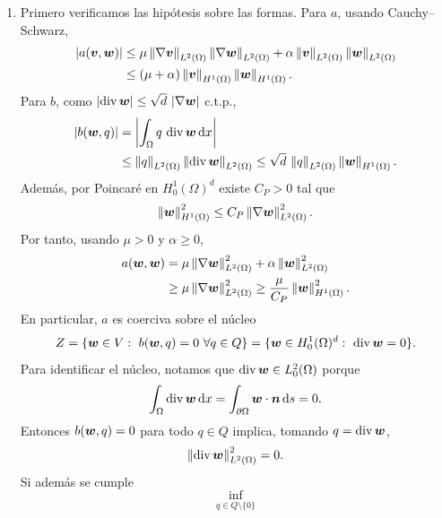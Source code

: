 \documentclass[11pt]{article}
\newcommand{\norm}[1]{\left\lVert #1\right\rVert}
\newcommand{\abs}[1]{\left|#1\right|}
\def\vec   #1{\mbox{\boldmath $#1$}{}}
\def\dx{\mbox{\(\,\mathrm{d}x\)}}
\def\ds{\mbox{\(\,\mathrm{d}s\)}}
\DeclareMathOperator{\dive}{div}
\begin{document}
\begin{enumerate}[label=\textbf{\arabic*.}, leftmargin=*]
\begin{enumerate}[label=(\alph*)]
        \item Primero verificamos las hipótesis sobre las formas. Para $a$, usando Cauchy--Schwarz,
        \[
        \begin{aligned}
            \abs{a(\vec v,\vec w)}
            &\le
            \mu\norm{\nabla\vec v}_{L^2(\Omega)}
            \norm{\nabla\vec w}_{L^2(\Omega)}
            +\alpha\norm{\vec v}_{L^2(\Omega)}
            \norm{\vec w}_{L^2(\Omega)}\\
            &\le
            (\mu+\alpha)\norm{\vec v}_{H^1(\Omega)}
            \norm{\vec w}_{H^1(\Omega)}.
        \end{aligned}
        \]
        Para $b$, como $\abs{\dive\vec w}\le \sqrt d\,\abs{\nabla\vec w}$ c.t.p.,
        \[
        \begin{aligned}
            \abs{b(\vec w,q)}
            &=
            \abs{\int_\Omega q\,\dive\vec w\dx}\\
            &\le
            \norm{q}_{L^2(\Omega)}
            \norm{\dive\vec w}_{L^2(\Omega)}
            \le
            \sqrt d\,\norm{q}_{L^2(\Omega)}
            \norm{\vec w}_{H^1(\Omega)}.
        \end{aligned}
        \]
        Además, por Poincaré en $H^1_0(\Omega)^d$ existe $C_P>0$ tal que
        \[
            \norm{\vec w}_{H^1(\Omega)}^2
            \le C_P\norm{\nabla\vec w}_{L^2(\Omega)}^2.
        \]
        Por tanto, usando $\mu>0$ y $\alpha\ge0$,
        \[
        \begin{aligned}
            a(\vec w,\vec w)
            &=
            \mu\norm{\nabla\vec w}_{L^2(\Omega)}^2
            +\alpha\norm{\vec w}_{L^2(\Omega)}^2\\
            &\ge
            \mu\norm{\nabla\vec w}_{L^2(\Omega)}^2
            \ge
            \frac{\mu}{C_P}\norm{\vec w}_{H^1(\Omega)}^2.
        \end{aligned}
        \]
        En particular, $a$ es coerciva sobre el núcleo
        \[
            Z=\{\vec w\in V:\ b(\vec w,q)=0\ \forall q\in Q\}
            =
            \{\vec w\in H^1_0(\Omega)^d:\ \dive\vec w=0\}.
        \]
        Para identificar el núcleo, notamos que $\dive\vec w\in L^2_0(\Omega)$ porque
        \[
            \int_\Omega \dive\vec w\dx
            =
            \int_{\partial\Omega}\vec w\cdot\vec n\ds
            =0.
        \]
        Entonces $b(\vec w,q)=0$ para todo $q\in Q$ implica, tomando $q=\dive\vec w$,
        \[
            \norm{\dive\vec w}_{L^2(\Omega)}^2=0.
        \]
        Si además se cumple
        \[
            \inf_{q\in Q\setminus\{0\}}
\]
\end{enumerate}
\end{enumerate}
\end{document}
